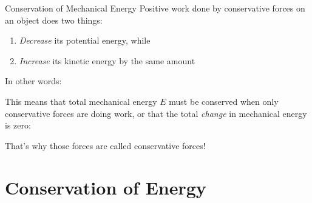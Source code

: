 \documentclass[12pt,compress,aspectratio=169]{beamer}
\begin{document}
\begin{frame}{Conservation of Mechanical Energy}
  Positive work done by conservative forces on an object does two things:
  \begin{enumerate}[1.]
  \item\emph{Decrease} its potential energy, while
  \item\emph{Increase} its kinetic energy by the same amount
  \end{enumerate}
  In other words:


  \vspace{-.15in}This means that total mechanical energy $E$ must be conserved
  when only conservative forces are doing work, or that the total \emph{change}
  in mechanical energy is zero:
  

  \vspace{-.15in}That's why those forces are called conservative forces!
\end{frame}



\section{Conservation of Energy}
\end{document}

